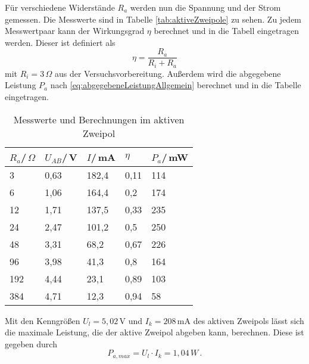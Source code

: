 Für verschiedene Widerstände $R_a$ werden nun die Spannung und der Strom gemessen. Die Messwerte sind in Tabelle \ref{tab:aktiveZweipole} zu sehen. Zu jedem Messwertpaar kann der Wirkungsgrad $\eta$ berechnet und in die Tabell eingetragen werden. Dieser ist definiert als
\begin{equation*}
    \label{eq:wirkungsgrad}
    \eta = \frac{R_a}{R_i+R_a}
\end{equation*} mit $R_i = 3\,\Omega$ aus der Versuchsvorbereitung. Außerdem wird die abgegebene Leistung $P_a$ nach \eqref{eq:abgegebeneLeistungAllgemein} berechnet und in die Tabelle eingetragen.
\begin{center}
    \begin{table}[ht]
        \begin{tabularx}{\linewidth}{|*{5}{X|}}
            \hline
            $R_a$/\,$\Omega$ & $U_{AB}$/\,V & $I$/\,mA & ${\eta}$ & $P_a$/\,mW \\
            \hline
            3                & 0,63         & 182,4    & 0,11     & 114        \\
            6                & 1,06         & 164,4    & 0,2      & 174        \\
            12               & 1,71         & 137,5    & 0,33     & 235        \\
            24               & 2,47         & 101,2    & 0,5      & 250        \\
            48               & 3,31         & 68,2     & 0,67     & 226        \\
            96               & 3,98         & 41,3     & 0,8      & 164        \\
            192              & 4,44         & 23,1     & 0,89     & 103        \\
            384              & 4,71         & 12,3     & 0,94     & 58         \\
            \hline
        \end{tabularx}
        \caption{Messwerte und Berechnungen im aktiven Zweipol}
        \label{tab:messwerteAktiverZweipol}
    \end{table}
\end{center}

Mit den Kenngrößen $U_l=5,02\,$V und $I_k=208\,$mA des aktiven Zweipols lässt sich die maximale Leistung, die der aktive Zweipol abgeben kann, berechnen. Diese ist gegeben durch
\begin{equation*}
    P_{a,max} = U_l \cdot I_k = 1,04\,W\, .
\end{equation*}

